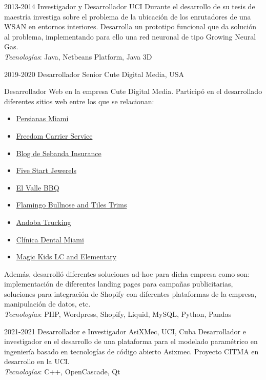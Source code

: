 \documentclass[letterpaper]{twentyonesecondcv} %
\begin{document}
{\begin{twenty}
    	\twentyitem
    	{2013-2014}
    	{Investigador y Desarrollador}
    	{UCI}
    	{Durante el desarrollo de su tesis de maestría investiga sobre el problema de la
    		ubicación de los enrutadores de una WSAN en entornos interiores. Desarrolla 
    		un prototipo funcional que da solución al problema, implementando
    		para ello una red neuronal de tipo Growing Neural Gas.\\
    		\textit{Tecnologías}: Java, Netbeans Platform, Java 3D}
    	
    	\twentyitem
    	{2019-2020}
    	{Desarrollador Senior}
    	{Cute Digital Media, USA}
    	{Desarrollador Web en la empresa Cute Digital Media. Participó en el desarrollado
    	diferentes sitios web entre los que se relacionan:
    	\begin{itemize}
	    	\item \href{https://persianasmiami.com/}{Persianas Miami}
	    	\item \href{https://freedomcarrierservice.com/}{Freedom Carrier Service}
	    	\item \href{https://www.sebandainsurance.com/es/blog/}{Blog de Sebanda Insurance}
	    	\item \href{https://www.fivestarjewelers.com/}{Five Start Jewerels}
	    	\item \href{https://elvallebbq.com/}{El Valle BBQ}
		    \item \href{https://www.flamingobullnose.com}{Flamingo Bullnose and Tiles Trims}
		    \item \href{https://andobatrucking.com/}{Andoba Trucking}
		    \item \href{https://www.cutedigitalmedia.com/}{Clínica Dental Miami}
		    \item \href{https://www.cutedigitalmedia.com/}{Magic Kids LC and Elementary }
	    \end{itemize}
    	Además, desarrolló diferentes soluciones ad-hoc para dicha empresa como son:
    	implementación de diferentes landing pages para campañas publicitarias,
    	soluciones para integración de Shopify con diferentes plataformas de la
    	empresa, manipulación de datos, etc.\\
    	\textit{Tecnologías}: PHP, Wordpress, Shopify, Liquid, MySQL, Python, Pandas
		}
    	
    	\twentyitem
    	{2021-2021}
    	{Desarrollador e Investigador}
    	{AsiXMec, UCI, Cuba}
    	{Desarrollador e investigador en el desarrollo de una plataforma para el
    	 modelado paramétrico en ingeniería basado en tecnologías de código abierto
    	 Asixmec. Proyecto CITMA en desarrollo en la UCI.\\
     	 \textit{Tecnologías}: C++, OpenCascade, Qt}
    	
    	
    
    	
    	
    \end{twenty}


}
\end{document}
